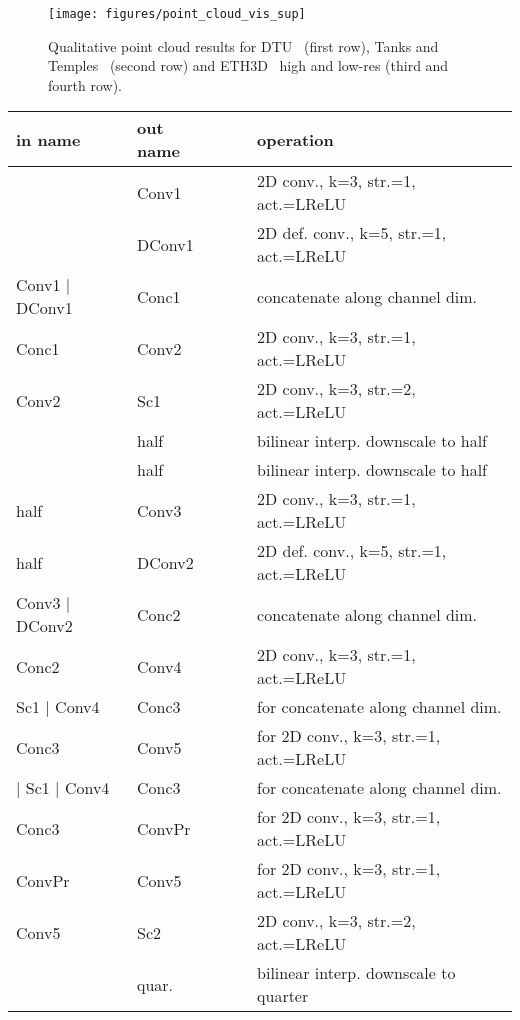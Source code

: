 \documentclass{bmvc2k}
\begin{document}
\begin{figure}[t]
\centering
\texttt{[image: figures/point\_cloud\_vis\_sup]}
\caption{Qualitative point cloud results for DTU~\cite{dtu} (first row), Tanks and Temples~\cite{tanksandtemples} (second row) and ETH3D~\cite{eth3d} high and low-res (third and fourth row).}
\label{fig_sup_point_cloud_vis}
\end{figure}

\begin{table}[t] 
  \centering
  \small
  \setlength{\tabcolsep}{1pt}
  \begin{tabular}{@{}llccl@{}}
      \toprule
      in name & out name &  &  & operation \\ \midrule
       & Conv1 &  &  & 2D conv., k=3, str.=1, act.=LReLU \\
       & DConv1 &  &  & 2D def. conv., k=5, str.=1, act.=LReLU \\
      Conv1 | DConv1 & Conc1 &  &  & concatenate along channel dim. \\
      Conc1 & Conv2 &  &  & 2D conv., k=3, str.=1, act.=LReLU \\
      Conv2 & Sc1 &  &  & 2D conv., k=3, str.=2, act.=LReLU \\
       &  half &  &  & bilinear interp. downscale to half \\
       &  half &  &  & bilinear interp. downscale to half \\
       half & Conv3 &  &  & 2D conv., k=3, str.=1, act.=LReLU
      \\
       half & DConv2 &  &  & 2D def. conv., k=5, str.=1, act.=LReLU \\
      Conv3 | DConv2 & Conc2 &  &  & concatenate along channel dim. \\
      Conc2 & Conv4 &  &  & 2D conv., k=3, str.=1, act.=LReLU \\
      Sc1 | Conv4 & Conc3 &  &  & for  concatenate along channel dim. \\
      Conc3 & Conv5 &  &  & for  2D conv., k=3, str.=1, act.=LReLU \\
       | Sc1 | Conv4 & Conc3 &  &  & for  concatenate along channel dim. \\
      Conc3 & ConvPr &  &  & for  2D conv., k=3, str.=1, act.=LReLU \\
      ConvPr & Conv5 &  &  & for  2D conv., k=3, str.=1, act.=LReLU \\
      Conv5 & Sc2 &  &  & 2D conv., k=3, str.=2, act.=LReLU \\
       &  quar. &  &  & bilinear interp. downscale to quarter \\

\end{tabular}
\end{table}
\end{document}
